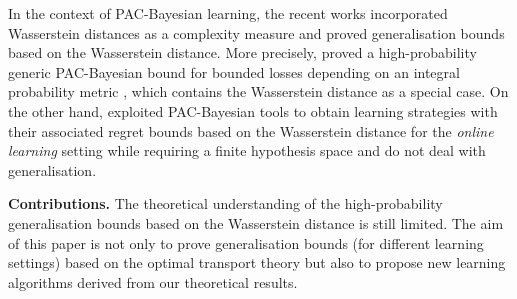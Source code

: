 \documentclass{article}
\begin{document}
In the context of PAC-Bayesian learning, the recent works \cite{amit2022integral,chee2021learning} incorporated Wasserstein distances as a complexity measure and proved generalisation bounds based on the Wasserstein distance.
More precisely, \cite{amit2022integral} proved a high-probability generic PAC-Bayesian bound for bounded losses depending on an integral probability metric \citep{muller1997integral}, which contains the Wasserstein distance as a special case. 
On the other hand, \cite{chee2021learning} exploited PAC-Bayesian tools to obtain learning strategies with their associated regret bounds based on the Wasserstein distance for the \emph{online learning} setting while requiring a finite hypothesis space and do not deal with generalisation.

\textbf{Contributions.}
The theoretical understanding of the high-probability generalisation bounds based on the Wasserstein distance is still limited.
The aim of this paper is not only to prove generalisation bounds (for different learning settings) based on the optimal transport theory but also to propose new learning algorithms derived from our theoretical results.
\end{document}
